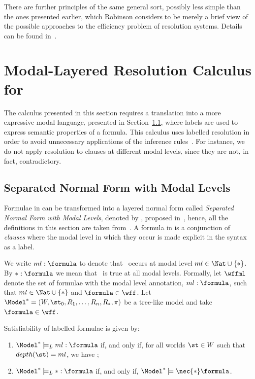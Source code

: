 There are further principles of the same general sort, possibly less simple than
the ones presented earlier, which Robinson considers to be merely a brief view
of the possible approaches to the efficiency problem of resolution systems.
Details can be found in~\cite{Robinson65}.

\section{Modal-Layered Resolution Calculus for }%
\label{sec:calculus}

The calculus presented in this section requires a translation into a more
expressive modal language, presented in Section~\ref{sec:snf}, where labels are
used to express semantic properties of a formula. This calculus uses 
labelled resolution in order to avoid unnecessary applications of the inference
rules~\cite{nalon2015modal}. For instance, we do not apply resolution to clauses
at different modal levels, since they are not, in fact, contradictory.

\subsection{Separated Normal Form with Modal Levels}%
\label{sec:snf}

Formulae in  can be transformed into a layered normal form called
\emph{Separated Normal Form with Modal Levels}, denoted by , proposed
in~\cite{journals/jal/NalonD07}, hence, all the definitions in this section are
taken from~\cite{journals/jal/NalonD07}. A formula in  is a
conjunction of \emph{clauses} where the modal level in which they occur is made
explicit in the syntax as a label.

We write $ml: \formula$ to denote that \formula~occurs at modal level $ml\in
\Nat \cup \{*\}$. By $*: \formula$ we mean that \formula~is true at
all modal levels. Formally, let $\wffml$ denote the set of formulae with
the modal level annotation, $ml : \formula$, such that $ml \in \Nat \cup \{*\}$
and $\formula \in \wff$. Let $\Model^* = (W, \st_0, R_1, \ldots, R_n, R_*, \pi)$
be a tree-like model and take $\formula \in \wff$. 

\begin{definition}
Satisfiability of labelled formulae is given by:

\begin{enumerate}
    \item $\Model^* \models_L ml : \formula$ if, and only if, for all worlds
        $\st \in W$ such that $depth(\st) = ml$, we have
        \sat{\Model^*}{\st}{\formula};
    \item $\Model^* \models_L * : \formula$ if, and only if, $\Model^* \models
        \nec{*} \formula$.
\end{enumerate}
    
\end{definition}

